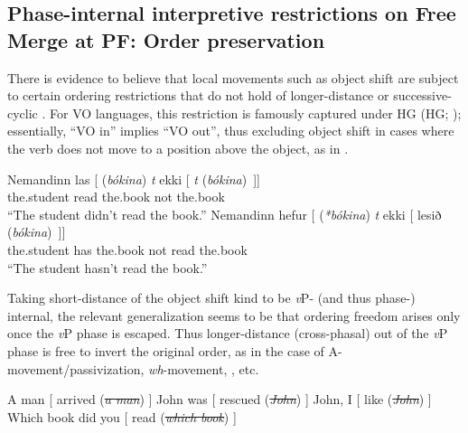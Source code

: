 \documentclass[output=paper]{langsci/langscibook}
\begin{document}
\subsection{Phase-internal interpretive restrictions on Free Merge at PF: Order
preservation}\label{sub:22.2.1}

There is evidence to believe that local movements such as object shift are
subject to certain ordering restrictions that do not hold of longer-distance or
successive-cyclic . For VO languages, this restriction is famously
captured under \glsdesc{HG} (\gls{HG};
\citealt{Holmberg1986,Holmberg1999}); essentially, \enquote{VO in} implies \enquote{VO out},
thus excluding object shift in cases where the verb does not move to a position
above the object, as in .

\ea\label{ex:22.5} 
    \ea\label{ex:22.5a}
        \gll    Nemandinn  las   [\emph{} (\textit{bókina}) \emph{t} ekki [ \emph{t} (\textit{bókina})~]] \\
                the.student read {} \hphantom{(}the.book {} not {} {} \hphantom{(}the.book\\
        \glt \enquote{The student didn't read the book.}
    \ex\label{ex:22.5b}
        \gll    Nemandinn hefur [\emph{} (\textit{*bókina}) \emph{t} ekki [ lesið (\textit{bókina})~]]\\
                the.student has {} \hphantom{(*}the.book {} not {} read \hphantom{(}the.book\\
        \glt \enquote{The student hasn't read the book.}
    \z
\z

Taking short-distance  of the object shift kind to be \emph{v}P- (and
thus phase-) internal, the relevant generalization seems to be that ordering
freedom arises only once the \emph{v}P phase is escaped. Thus longer-distance
(cross-phasal)  out of the \emph{v}P phase is free to invert the
original order, as in the case of A-movement/passivization, \emph{wh}-movement,
, etc.\largerpage

\ea\label{ex:22.6}
\ea  A man [\emph{} arrived (\sout{\emph{a man}}) ]
\ex John was [\emph{} rescued (\sout{\emph{John}}) ]
\ex John, I [\emph{} like (\sout{\emph{John}}) ]
    \ex Which book did you [\emph{} read (\sout{\emph{which
    book}}) ]
    \z
\z
\end{document}
